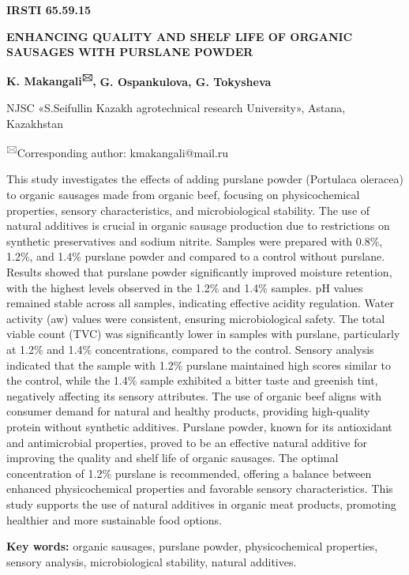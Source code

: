 




\newpage
{\bfseries IRSTI 65.59.15}

{\bfseries ENHANCING QUALITY AND SHELF LIFE OF ORGANIC SAUSAGES WITH
PURSLANE POWDER}

{\bfseries K. Makangali\textsuperscript{🖂},} {\bfseries G. Ospankulova, G.
Tokysheva}

NJSC «S.Seifullin Kazakh agrotechnical research University», Astana,
Kazakhstan

\textsuperscript{🖂}Corresponding author: kmakangali@mail.ru

This study investigates the effects of adding purslane powder (Portulaca
oleracea) to organic sausages made from organic beef, focusing on
physicochemical properties, sensory characteristics, and microbiological
stability. The use of natural additives is crucial in organic sausage
production due to restrictions on synthetic preservatives and sodium
nitrite. Samples were prepared with 0.8\%, 1.2\%, and 1.4\% purslane
powder and compared to a control without purslane. Results showed that
purslane powder significantly improved moisture retention, with the
highest levels observed in the 1.2\% and 1.4\% samples. pH values
remained stable across all samples, indicating effective acidity
regulation. Water activity (aw) values were consistent, ensuring
microbiological safety. The total viable count (TVC) was significantly
lower in samples with purslane, particularly at 1.2\% and 1.4\%
concentrations, compared to the control. Sensory analysis indicated that
the sample with 1.2\% purslane maintained high scores similar to the
control, while the 1.4\% sample exhibited a bitter taste and greenish
tint, negatively affecting its sensory attributes. The use of organic
beef aligns with consumer demand for natural and healthy products,
providing high-quality protein without synthetic additives. Purslane
powder, known for its antioxidant and antimicrobial properties, proved
to be an effective natural additive for improving the quality and shelf
life of organic sausages. The optimal concentration of 1.2\% purslane is
recommended, offering a balance between enhanced physicochemical
properties and favorable sensory characteristics. This study supports
the use of natural additives in organic meat products, promoting
healthier and more sustainable food options.

{\bfseries Key words:} organic sausages, purslane powder, physicochemical
properties, sensory analysis, microbiological stability, natural
additives.


